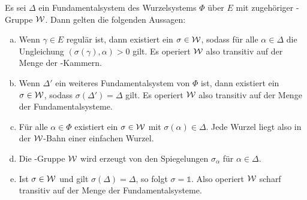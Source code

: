 \begin{samepage}
\begin{thm}
  \label{thm:simplyTransitive}
  Es sei $\Delta$ ein Fundamentalsystem des Wurzelsystems $\Phi$ über $E$ mit zugehöriger \weyl\hyp{}Gruppe $\mathcal{W}$.
  Dann gelten die folgenden Aussagen:
  \begin{enumerate}[(a)]

    \item Wenn $\gamma \in E$ regulär ist, dann existiert ein $\sigma \in \mathcal{W}$, sodass für alle $\alpha \in \Delta$ die Ungleichung $(\sigma(\gamma), \alpha) > 0$ gilt. 
      Es operiert $\mathcal{W}$ also transitiv auf der Menge der \weyl\hyp{}Kammern.

    \item Wenn $\Delta'$ ein weiteres Fundamentalsystem von $\Phi$ ist, dann existiert ein $\sigma \in \mathcal{W}$, sodass $\sigma(\Delta') = \Delta$ gilt.
      Es operiert $\mathcal{W}$ also transitiv auf der Menge der Fundamental\-systeme.

    \item Für alle $\alpha \in \Phi$ existiert ein $\sigma \in \mathcal{W}$ mit $\sigma(\alpha) \in \Delta$.
      Jede Wurzel liegt also in der $\mathcal{W}$\hyp{}Bahn einer einfachen Wurzel.

    \item Die \weyl\hyp{}Gruppe $\mathcal{W}$ wird erzeugt von den Spiegelungen $\sigma_\alpha$ für $\alpha \in \Delta$.

    \item Ist $\sigma \in \mathcal{W}$ und gilt $\sigma(\Delta) = \Delta$, so folgt $\sigma = \mathds{1}$.
      Also operiert $\mathcal{W}$ scharf transitiv auf der Menge der Fundamental\-systeme.
  \end{enumerate}
\end{thm}
\end{samepage}

